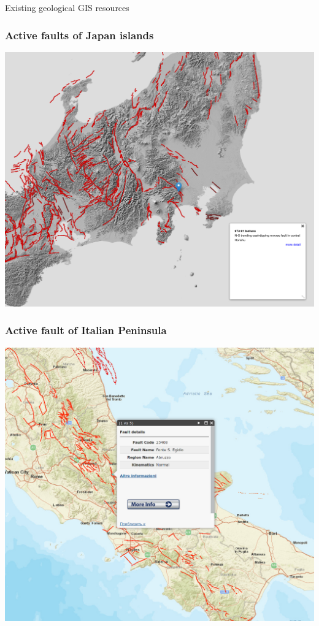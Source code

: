 \documentclass[10pt]{beamer}
\begin{document}
\begin{frame}\centering
  \Large Existing geological GIS resources
\end{frame}


\begin{frame}
  \frametitle{Active faults of Japan islands}
  \centering
  \includegraphics[width=\linewidth]{japan.png}
\end{frame}

\begin{frame}
  \frametitle{Active fault of Italian Peninsula}
  \centering
  \includegraphics[width=\linewidth]{italy-1.png}
\end{frame}
\end{document}
